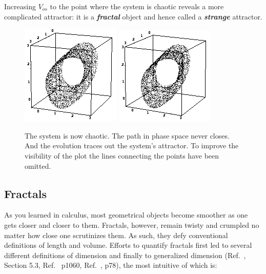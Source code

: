 \documentclass{../lab}
\begin{document}
Increasing $V_{os}$ to the point where the system is chaotic reveals a more complicated attractor: it is a \emph{\textbf{fractal}} object and hence called a \emph{\textbf{strange}} attractor.

\begin{figure}
    \centering
    \href{http://experimentationlab.berkeley.edu/sites/default/files/images/Nldimage048.gif}{\includegraphics[width=0.33\linewidth,keepaspectratio]{images/Nldimage048.png}}
    \href{http://experimentationlab.berkeley.edu/sites/default/files/images/Nldimage049.gif}{\includegraphics[width=0.33\linewidth,keepaspectratio]{images/Nldimage049.png}}
    \caption{The system is now chaotic. The path in phase space never closes. And the evolution traces out the system's attractor. To improve the visibility of the plot the lines connecting the points have been omitted.}
\end{figure}

\subsection{Fractals}

As you learned in calculus, most geometrical objects become smoother as one gets closer and closer to them. Fractals, however, remain twisty and crumpled no matter how close one scrutinizes them. As such, they defy conventional definitions of length and volume. Efforts to quantify fractals first led to several different definitions of dimension and finally to generalized dimension (Ref.~\cite{Schuster}, Section 5.3, Ref.~\cite{Press} p1060, Ref.~\cite{Ott}, p78), the most intuitive of which is:
\end{document}
